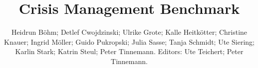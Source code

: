 \documentclass[11pt]{book}
\title{Crisis Management Benchmark}
\author{Heidrun Böhm; Detlef Cwojdzinski; Ulrike Grote; Kalle Heitkötter; Christine Knauer; Ingrid Möller; Guido Pukropski; Julia Sasse; Tanja Schmidt; Ute Siering; Karlin Stark; Katrin Steul; Peter Tinnemann. Editors: Ute Teichert; Peter Tinnemann.}
\begin{document}
\maketitle
\def\title#1{\chapter{#1}}
\tableofcontents

        
        
\end{document}
